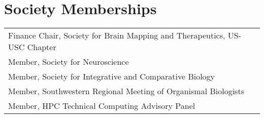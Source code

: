 \documentclass[10pt,a4paper]{article}
\begin{document}
\vspace*{2mm}\section*{Society Memberships}
\vspace*{1mm}\noindent\begin{tabularx}{17cm}{X r}
  Finance Chair, Society for Brain Mapping and Therapeutics, US-USC Chapter \\ %
  Member, Society for Neuroscience \\
  Member, Society for Integrative and Comparative Biology \\
  Member, Southwestern Regional Meeting of Organismal Biologists \\
  Member, HPC Technical Computing Advisory Panel \\ %
\end{tabularx}

\end{document}
